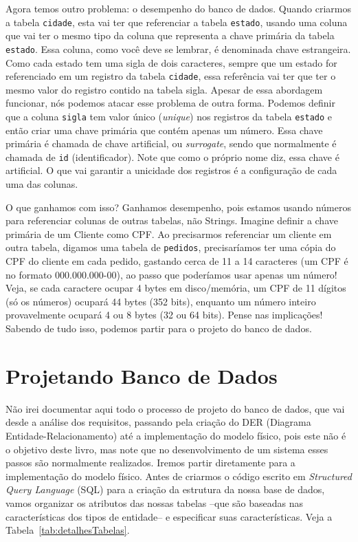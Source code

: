 Agora temos outro problema: o desempenho do banco de dados. Quando criarmos a tabela \texttt{cidade}, esta vai ter que referenciar a tabela \texttt{estado}, usando uma coluna que vai ter o mesmo tipo da coluna que representa a chave primária da tabela \texttt{estado}. Essa coluna, como você deve se lembrar, é denominada chave estrangeira. Como cada estado tem uma sigla de dois caracteres, sempre que um estado for referenciado em um registro da tabela \texttt{cidade}, essa referência vai ter que ter o mesmo valor do registro contido na tabela sigla. Apesar de essa abordagem funcionar, nós podemos atacar esse problema de outra forma. Podemos definir que a coluna \texttt{sigla} tem valor único (\textit{unique}) nos registros da tabela \texttt{estado} e então criar uma chave primária que contém apenas um número. Essa chave primária é chamada de chave artificial, ou \textit{surrogate}, sendo que normalmente é chamada de \texttt{id} (identificador). Note que como o próprio nome diz, essa chave é artificial. O que vai garantir a unicidade dos registros é a configuração de cada uma das colunas.

O que ganhamos com isso? Ganhamos desempenho, pois estamos usando números para referenciar colunas de outras tabelas, não Strings. Imagine definir a chave primária de um Cliente como CPF. Ao precisarmos referenciar um cliente em outra tabela, digamos uma tabela de \texttt{pedidos}, precisaríamos ter uma cópia do CPF do cliente em cada pedido, gastando cerca de 11 a 14 caracteres (um CPF é no formato 000.000.000-00), ao passo que poderíamos usar apenas um número! Veja, se cada caractere ocupar 4 bytes em disco/memória, um CPF de 11 dígitos (só os números) ocupará 44 bytes (352 bits), enquanto um número inteiro provavelmente ocupará 4 ou 8 bytes (32 ou 64 bits). Pense nas implicações! Sabendo de tudo isso, podemos partir para o projeto do banco de dados.


\section{Projetando Banco de Dados}

Não irei documentar aqui todo o processo de projeto do banco de dados, que vai desde a análise dos requisitos, passando pela criação do DER (Diagrama Entidade-Relacionamento) até a implementação do modelo físico, pois este não é o objetivo deste livro, mas note que no desenvolvimento de um sistema esses passos são normalmente realizados. Iremos partir diretamente para a implementação do modelo físico. Antes de criarmos o código escrito em \textit{Structured Query Language} (SQL) para a criação da estrutura da nossa base de dados, vamos organizar os atributos das nossas tabelas –que são baseadas nas características dos tipos de entidade– e especificar suas características. Veja a Tabela~\ref{tab:detalhesTabelas}.

